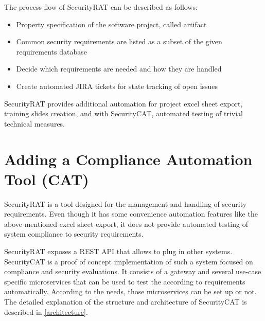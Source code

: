 \vskip 1cm

The process flow of SecurityRAT can be described as follows:

\begin{itemize}\itemsep0pt \parskip0pt 
    \item Property specification of the software project, called artifact 
    \item Common security requirements are listed as a subset of the given requirements database
    \item Decide which requirements are needed and how they are handled
    \item Create automated JIRA tickets for state tracking of open issues
\end{itemize}

SecurityRAT provides additional automation for project excel sheet export, training slides creation, and with SecurityCAT, automated testing of trivial technical measures.


\section{Adding a Compliance Automation Tool (CAT)}
\label{secCat}
SecurityRAT is a tool designed for the management and handling of security requirements. Even though it has some convenience automation features like the above mentioned excel sheet export, it does not provide automated testing of system compliance to security requirements.

SecurityRAT exposes a REST API that allows to plug in other systems. SecurityCAT is a proof of concept implementation of such a system focused on compliance and security evaluations. It consists of a gateway and several use-case specific microservices that can be used to test the according to requirements automatically. According to the needs, those microservices can be set up or not. The detailed explanation of the structure and architecture of SecurityCAT is described in \ref{architecture}.

\newpage

